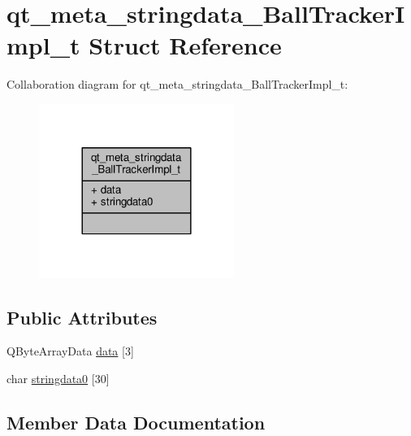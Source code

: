 \hypertarget{structqt__meta__stringdata___ball_tracker_impl__t}{}\section{qt\+\_\+meta\+\_\+stringdata\+\_\+\+Ball\+Tracker\+Impl\+\_\+t Struct Reference}
\label{structqt__meta__stringdata___ball_tracker_impl__t}


Collaboration diagram for qt\+\_\+meta\+\_\+stringdata\+\_\+\+Ball\+Tracker\+Impl\+\_\+t\+:\nopagebreak
\begin{figure}[H]
\begin{center}
\leavevmode
\includegraphics[width=180pt]{structqt__meta__stringdata___ball_tracker_impl__t__coll__graph}
\end{center}
\end{figure}
\subsection*{Public Attributes}
\begin{DoxyCompactItemize}
\item 
Q\+Byte\+Array\+Data \hyperlink{structqt__meta__stringdata___ball_tracker_impl__t_aaa7d7ef4a4a293040f1ceb14790880db}{data} \mbox{[}3\mbox{]}
\item 
char \hyperlink{structqt__meta__stringdata___ball_tracker_impl__t_a04a60b2f79a2e3d26ef56213f357c24f}{stringdata0} \mbox{[}30\mbox{]}
\end{DoxyCompactItemize}


\subsection{Member Data Documentation}
